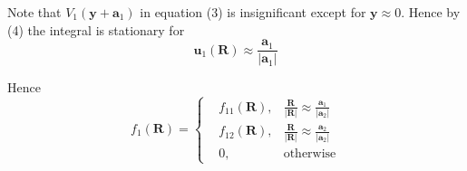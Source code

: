 \documentclass[12pt]{article}
\begin{document}
Note that $V_1(\mathbf y+\mathbf a_1)$ in equation (3) is insignificant
except for $\mathbf y\approx0$.
Hence by (4) the integral is stationary for
\begin{equation*}
\mathbf u_1(\mathbf R)\approx\frac{\mathbf a_1}{|\mathbf a_1|}
\end{equation*}

Hence
\begin{equation*}
f_1(\mathbf R)=\left\{
\begin{aligned}
& f_{11}(\mathbf R), & \frac{\mathbf R}{|\mathbf R|}\approx\frac{\mathbf a_1}{|\mathbf a_2|}
\\
& f_{12}(\mathbf R), & \frac{\mathbf R}{|\mathbf R|}\approx\frac{\mathbf a_2}{|\mathbf a_2|}
\\
& 0, & \text{otherwise}
\end{aligned}
\right.
\end{equation*}
\end{document}
